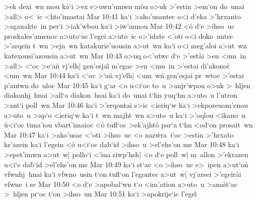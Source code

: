>ek
dexi~wn
mou
k\r{a}`i
>ex
e>uwn'umwn
m\r{o}u
o>uk
>'estin
>em`on
do~unai
>all>
o<~ic
<hto'imastai\bibvsend
\vs Mar 10:41
ka`i
>ako'usantec
o<i
d'eka
>'hrxanto
>aganakte~in
per`i
>iak'wbou
ka`i
>iw'annou\bibvsend
\vs Mar 10:42
<o\r{}
d`e
>ihso~uc
proskales'amenoc
a>uto`uc
l'egei
a>uto~ic
o>'idate
<'oti
o<i
doko~untec
>'arqein
t~wn
>ejn~wn
katakurie'uousin
a>ut~wn
ka`i
o<i
meg'aloi
a>ut~wn
katexousi'azousin
a>ut~wn\bibvsend
\vs Mar 10:43
o>uq
o<'utwc
d`e
>'est\r{a}i
>en
<um~in
>all>
<`oc
>e`a\r{n}
vj'elh|
gen'esjai\r{}
m'egac
>en
<um~in
>'estai
di'akonoc\r{}
<um~wn\bibvsend
\vs Mar 10:44
ka`i
<`oc
>`a\r{n}
vj'elh|
<um~wn\r{}
gen'esjai
pr~wtoc
>'estai
p'antwn
do~uloc\bibvsend
\vs Mar 10:45
ka`i
g`ar
<o
u<i`oc
to~u
>anjr'wpou
o>uk
>~hljen
diakonhj~hnai
>all`a
diakon~hsai
ka`i
do~unai
t`hn
yuq`hn
a>uto~u
l'utron
>ant`i
poll~wn\bibvsend
\vs Mar 10:46
ka`i
>'erqontai
e>ic
<ieriq`w
ka`i
>ekporeuom'enou
a>uto~u
>ap`o
<ieriq`w
ka`i
t~wn
majht~wn
a>uto~u
ka`i
>'oqlou
<ikano~u
\r{u}<i`oc
tima'iou
vbart'imaioc
<o\r{}
tufl`oc
>ek'ajhto\r{}
par`a
t`hn
<od`on
prosait~wn\bibvsend
\vs Mar 10:47
ka`i
>ako'usac
<'oti
>ihso~uc
<o
naz\r{w}ra~i'oc
>estin
>'hrxato
kr'azein
ka`i
l'egein
<o\r{}
u<i`oc
dab`id
>ihso~u
>el'ehs'on
me\bibvsend
\vs Mar 10:48
ka`i
>epet'imwn
a>ut~w|
pollo`i
<'ina
siwp'hsh|
<o
d`e
poll~w|
m~allon
>'ekrazen
u<i`e
da\r{b}`id
>el'ehs'on
me\bibvsend
\vs Mar 10:49
ka`i
st`ac
<o
>ihso~uc
e>~ipen
a>ut`on\r{}
vfwnhj~hnai
ka`i
vfwno~usin
t`on
tufl`on
l'egontec
a>ut~w|
vj'arsei
>'egeir\r{a}i
vfwne~i
se\bibvsend
\vs Mar 10:50
<o
d`e
>apobal`wn
t`o
<im'ation
a>uto~u
>ana\r{s}t`ac
>~hljen
pr`oc
t`on
>ihso~un\bibvsend
\vs Mar 10:51
ka`i
>apokrije`ic
l'egei\r{}
